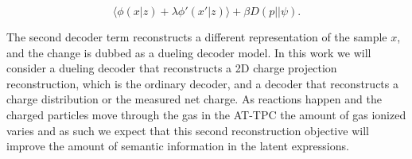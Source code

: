 \begin{equation}\label{eq:dueling_decoder}
\langle\phi(x|z) + \lambda\phi'(x'|z) \rangle + \beta D(p || \psi).
\end{equation}

\noindent The second decoder term reconstructs a different representation of the sample $x$, and the change is dubbed as a dueling decoder model. In this work we will consider a dueling decoder that reconstructs a 2D charge projection reconstruction, which is the ordinary decoder, and a decoder that reconstructs a charge distribution or the measured net charge. As reactions happen and the charged particles move through the gas in the AT-TPC the amount of gas ionized varies and as such we expect that this second reconstruction objective will improve the amount of semantic information in the latent expressions.

